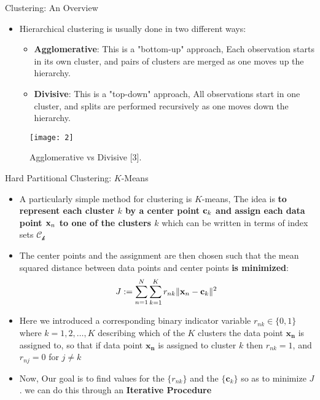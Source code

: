 \documentclass[compress,oilve]{beamer}
\begin{document}
\begin{frame}{Clustering: An Overview}
\begin{itemize}
\item Hierarchical clustering is usually done in two different ways:
	\begin{itemize}
		\item \textbf{Agglomerative}: This is a "bottom-up" approach, Each observation starts in its own cluster, and pairs of clusters are merged as one moves up the hierarchy.
		\item \textbf{Divisive}: This is a "top-down" approach, All observations start in one cluster, and splits are performed recursively as one moves down the hierarchy.
	\end{itemize}
\end{itemize}
\begin{figure}
	\centering
	\texttt{[image: 2]}
	\caption{Agglomerative vs Divisive [3].}
\end{figure}
\end{frame}


\begin{frame}{Hard Partitional Clustering: $K$-Means}
\begin{itemize}
\item A particularly simple method for clustering is $K$-means, The idea is \textbf{to represent each cluster $ k $ by a center point $\mathbf{c_{\mathnormal k}} $ and assign each data point $ \mathbf{x_{\mathnormal n}}$ to one of the clusters $ k $} which can be written in terms of index sets $\mathcal{C_{k}}$
\item The center points and the assignment are then chosen such that the mean squared distance between data points and center points \textbf{is minimized}:
$$ J := \displaystyle\sum_{n=1}^{N} \displaystyle\sum_{k=1}^{K} r_{nk} \| \mathbf{x_{\mathnormal n}} -  \mathbf{c_{\mathnormal k}} \| ^ {2} $$
\item Here we introduced a corresponding binary indicator variable $ r_{nk} \in \{0, 1\} $ where $ k = 1, 2, \dots, K $ describing which of the $ K $ clusters the data point $ \mathbf{x_{n}} $ is assigned to, so that if data point  $ \mathbf{x_{n}} $ is assigned to cluster $ k $ then $ r_{nk} = 1$, and $ r_{nj} = 0 $ for $ j \neq k $
\item Now, Our goal is to find values for the $\{r_{nk}\}$ and the $ \{\mathbf c_{k}\}$ so as to minimize $ J $. we can do this through an \textbf{Iterative Procedure}
\end{itemize}
\end{frame}
\end{document}
